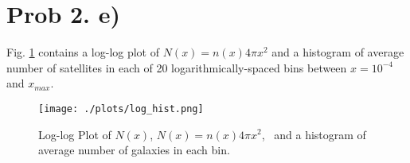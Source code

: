 \section{Prob 2. e)}

 Fig. \ref{fig:fig5} contains a log-log plot of $N(x)=n(x)4\pi x^2$ and a histogram of average number of satellites in each of 20 logarithmically-spaced bins between $x=10^{-4}$ and $x_{max}$.
 


\begin{figure}[ht!]
  \centering
  \texttt{[image: ./plots/log\_hist.png]}
  \caption{Log-log Plot of $N(x)$, $N(x) = n(x)4\pi x^2$, \
  and a histogram of average number of galaxies in each bin.}
  \label{fig:fig5}
\end{figure}

